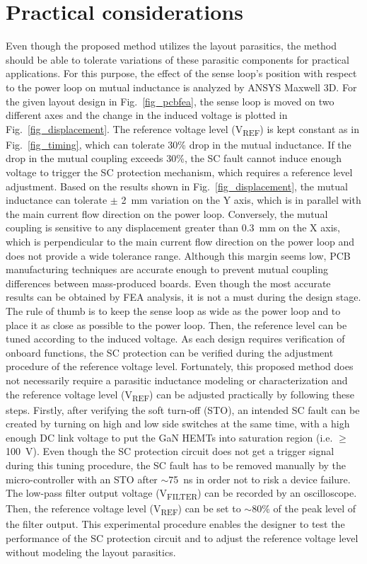 \documentclass[journal]{IEEEtran}
\begin{document}
\section{Practical considerations}
Even though the proposed method utilizes the layout parasitics, the method should be able to tolerate variations of these parasitic components for practical applications. For this purpose, the effect of the sense loop's position with respect to the power loop on mutual inductance is analyzed by ANSYS Maxwell 3D. For the given layout design in Fig.~\ref{fig_pcbfea}, the sense loop is moved on two different axes and the change in the induced voltage is plotted in Fig.~\ref{fig_displacement}. The reference voltage level (V\textsubscript{REF}) is kept constant as in Fig.~\ref{fig_timing}, which can tolerate 30\% drop in the mutual inductance. If the drop in the mutual coupling exceeds 30\%, the SC fault cannot induce enough voltage to trigger the SC protection mechanism, which requires a reference level adjustment. Based on the results shown in Fig.~\ref{fig_displacement}, the mutual inductance can tolerate $\pm$ 2~mm variation on the Y axis, which is in parallel with the main current flow direction on the power loop. Conversely, the mutual coupling is sensitive to any displacement greater than 0.3~mm on the X axis, which is perpendicular to the main current flow direction on the power loop and does not provide a wide tolerance range. Although this margin seems low, PCB manufacturing techniques are accurate enough to prevent mutual coupling differences between mass-produced boards. Even though the most accurate results can be obtained by FEA analysis, it is not a must during the design stage. The rule of thumb is to keep the sense loop as wide as the power loop and to place it as close as possible to the power loop. Then, the reference level can be tuned according to the induced voltage. As each design requires verification of onboard functions, the SC protection can be verified during the adjustment procedure of the reference voltage level. Fortunately, this proposed method does not necessarily require a parasitic inductance modeling or characterization and the reference voltage level (V\textsubscript{REF}) can be adjusted practically by following these steps. Firstly, after verifying the soft turn-off (STO), an intended SC fault can be created by turning on high and low side switches at the same time, with a high enough DC link voltage to put the GaN HEMTs into saturation region (i.e. $\geq$100~V). Even though the SC protection circuit does not get a trigger signal during this tuning procedure, the SC fault has to be removed manually by the micro-controller with an STO after $\sim$75~ns in order not to risk a device failure. The low-pass filter output voltage (V\textsubscript{FILTER}) can be recorded by an oscilloscope. Then, the reference voltage level (V\textsubscript{REF}) can be set to $\sim$80\% of the peak level of the filter output. This experimental procedure enables the designer to test the performance of the SC protection circuit and to adjust the reference voltage level without modeling the layout parasitics.
\end{document}
